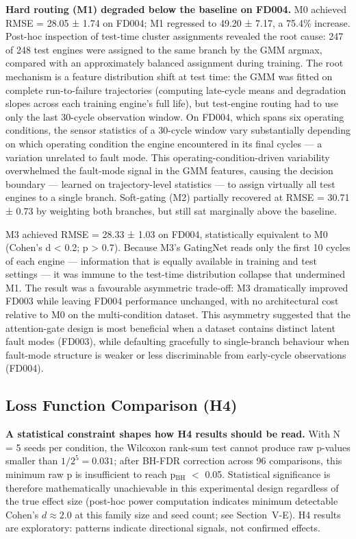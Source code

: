 \documentclass[review,12pt]{elsarticle}
\begin{document}
\textbf{Hard routing (M1) degraded below the baseline on FD004.} M0 achieved RMSE = 28.05 ± 1.74 on FD004; M1 regressed to 49.20 ± 7.17, a 75.4\% increase. Post-hoc inspection of test-time cluster assignments revealed the root cause: 247 of 248 test engines were assigned to the same branch by the GMM argmax, compared with an approximately balanced assignment during training. The root mechanism is a feature distribution shift at test time: the GMM was fitted on complete run-to-failure trajectories (computing late-cycle means and degradation slopes across each training engine's full life), but test-engine routing had to use only the last 30-cycle observation window. On FD004, which spans six operating conditions, the sensor statistics of a 30-cycle window vary substantially depending on which operating condition the engine encountered in its final cycles --- a variation unrelated to fault mode. This operating-condition-driven variability overwhelmed the fault-mode signal in the GMM features, causing the decision boundary --- learned on trajectory-level statistics --- to assign virtually all test engines to a single branch. Soft-gating (M2) partially recovered at RMSE = 30.71 ± 0.73 by weighting both branches, but still sat marginally above the baseline.

M3 achieved RMSE = 28.33 ± 1.03 on FD004, statistically equivalent to M0 (Cohen's d < 0.2; p > 0.7). Because M3's GatingNet reads only the first 10 cycles of each engine — information that is equally available in training and test settings — it was immune to the test-time distribution collapse that undermined M1. The result was a favourable asymmetric trade-off: M3 dramatically improved FD003 while leaving FD004 performance unchanged, with no architectural cost relative to M0 on the multi-condition dataset. This asymmetry suggested that the attention-gate design is most beneficial when a dataset contains distinct latent fault modes (FD003), while defaulting gracefully to single-branch behaviour when fault-mode structure is weaker or less discriminable from early-cycle observations (FD004).

\subsection{Loss Function Comparison (H4)}

\textbf{A statistical constraint shapes how H4 results should be read.} With N = 5 seeds per condition, the Wilcoxon rank-sum test cannot produce raw p-values smaller than $1/2^5 = 0.031$; after BH-FDR correction across 96 comparisons, this minimum raw p is insufficient to reach p$_\text{BH}$ $<$ 0.05. Statistical significance is therefore mathematically unachievable in this experimental design regardless of the true effect size (post-hoc power computation indicates minimum detectable Cohen's $d \approx 2.0$ at this family size and seed count; see Section~V-E). H4 results are exploratory: patterns indicate directional signals, not confirmed effects.
\end{document}
